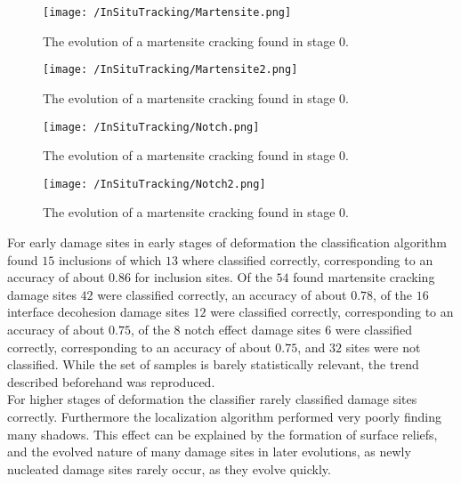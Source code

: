 \begin{figure}
\texttt{[image: /InSituTracking/Martensite.png]}
\caption{The evolution of a martensite cracking found in stage 0.}
\label{fig:MCEV1}
\end{figure}

\begin{figure}
\texttt{[image: /InSituTracking/Martensite2.png]}
\caption{The evolution of a martensite cracking found in stage 0.}
\label{fig:MCEV2}
\end{figure}



\begin{figure}
\texttt{[image: /InSituTracking/Notch.png]}
\caption{The evolution of a martensite cracking found in stage 0.}
\label{fig:NEEV1}
\end{figure}

\begin{figure}
\texttt{[image: /InSituTracking/Notch2.png]}
\caption{The evolution of a martensite cracking found in stage 0.}
\label{fig:NEEV2}
\end{figure}



For early damage sites in early stages of deformation the classification algorithm found $15$ inclusions of which $13$ where classified correctly, corresponding to an accuracy of about $0.86$ for inclusion sites. Of the $54$ found martensite cracking damage sites $42$ were classified correctly, an accuracy of about $0.78$, of the $16$ interface decohesion damage sites $12$ were classified correctly, corresponding to an accuracy of about $0.75$, of the $8$ notch effect damage sites $6$ were classified correctly, corresponding to an accuracy of about $0.75$, and $32$ sites were not classified. While the set of samples is barely statistically relevant, the trend described beforehand was reproduced. \\

For higher stages of deformation the classifier rarely classified damage sites correctly. Furthermore the localization algorithm performed very poorly finding many shadows. This effect can be explained by the formation of surface reliefs, and the evolved nature of many damage sites in later evolutions, as newly nucleated damage sites rarely occur, as they evolve quickly. 

